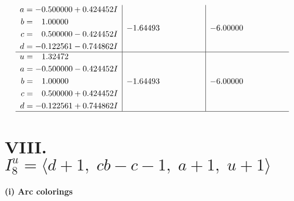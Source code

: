 \documentclass[1p]{elsarticle_modified}
\theoremstyle{definition}
\begin{document}
$$\begin{array}{c|c|c}
\begin{aligned}
a &= -0.500000 + 0.424452 I \\
b &= \phantom{-}1.00000\phantom{ +0.000000I} \\
c &= \phantom{-}0.500000 - 0.424452 I \\
d &= -0.122561 - 0.744862 I\end{aligned}
 & -1.64493\phantom{ +0.000000I} & -6.00000\phantom{ +0.000000I} \\ \hline\begin{aligned}
u &= \phantom{-}1.32472\phantom{ +0.000000I} \\
a &= -0.500000 - 0.424452 I \\
b &= \phantom{-}1.00000\phantom{ +0.000000I} \\
c &= \phantom{-}0.500000 + 0.424452 I \\
d &= -0.122561 + 0.744862 I\end{aligned}
 & -1.64493\phantom{ +0.000000I} & -6.00000\phantom{ +0.000000I}\\
 \hline 
 \end{array}$$\newpage\newpage\renewcommand{\arraystretch}{1}
\centering \section*{VIII. $I^u_{8}= \langle d+1,\;c b- c-1,\;a+1,\;u+1 \rangle$}
\flushleft \textbf{(i) Arc colorings}\\
\end{document}
